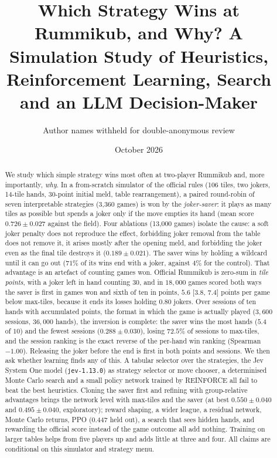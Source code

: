 \documentclass[11pt]{article}
\title{Which Strategy Wins at Rummikub, and Why? A Simulation Study of Heuristics, Reinforcement Learning, Search and an LLM Decision-Maker}
\author{Author names withheld for double-anonymous review}
\date{October 2026}
\begin{document}
\maketitle

\begin{abstract}
We study which simple strategy wins most often at two-player Rummikub and, more importantly, \emph{why}. In a from-scratch simulator of the official rules (106 tiles, two jokers, 14-tile hands, 30-point initial meld, table rearrangement), a paired round-robin of seven interpretable strategies (3{,}360 games) is won by the \emph{joker-saver}: it plays as many tiles as possible but spends a joker only if the move empties its hand (mean score $0.726\pm0.027$ against the field). Four ablations (13{,}000 games) isolate the cause: a soft joker penalty does not reproduce the effect, forbidding joker removal from the table does not remove it, it arises mostly after the opening meld, and forbidding the joker even as the final tile destroys it ($0.189\pm0.021$). The saver wins by holding a wildcard until it can go out ($71\%$ of its wins end with a joker, against $4\%$ for the control). That advantage is an artefact of counting games won. Official Rummikub is zero-sum in \emph{tile points}, with a joker left in hand counting $30$, and in $18{,}000$ games scored both ways the saver is first in games won and sixth of ten in points, $5.6$ [$3.8$, $7.4$] points per game below max-tiles, because it ends its losses holding $0.80$ jokers. Over sessions of ten hands with accumulated points, the format in which the game is actually played ($3{,}600$ sessions, $36{,}000$ hands), the inversion is complete: the saver wins the most hands ($5.4$ of $10$) and the fewest sessions ($0.288\pm0.030$), losing $72.5\%$ of sessions to max-tiles, and the session ranking is the exact reverse of the per-hand win ranking (Spearman $-1.00$). Releasing the joker before the end is first in both points and sessions. We then ask whether learning finds any of this. A tabular selector over the strategies, the Jev System One model (\texttt{jev-1.13.0}) as strategy selector or move chooser, a determinised Monte Carlo search and a small policy network trained by REINFORCE all fail to beat the best heuristics. Cloning the saver first and refining with group-relative advantages brings the network level with max-tiles and the saver (at best $0.550\pm0.040$ and $0.495\pm0.040$, exploratory); reward shaping, a wider league, a residual network, Monte Carlo returns, PPO (0.447 held out), a search that sees hidden hands, and rewarding the official score instead of the game outcome all add nothing. Training on larger tables helps from five players up and adds little at three and four. All claims are conditional on this simulator and strategy menu.
\end{abstract}
\end{document}
